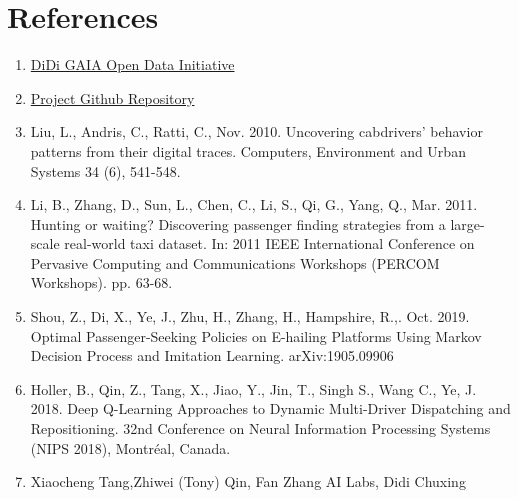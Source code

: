 \documentclass[11pt]{article}
\begin{document}
\section{References} 
\begin{enumerate}
    \item \href{https://outreach.didichuxing.com/research/opendata/en/}{DiDi GAIA Open Data Initiative}
    
    \item \href{https://github.com/rmahajan14/capstone_didi}{Project Github Repository}
    
    \item Liu, L., Andris, C., Ratti, C., Nov. 2010. Uncovering cabdrivers' behavior patterns from their digital traces. Computers, Environment and Urban Systems 34 (6), 541-548.
    
    \item Li, B., Zhang, D., Sun, L., Chen, C., Li, S., Qi, G., Yang, Q., Mar. 2011. Hunting or waiting? Discovering passenger finding strategies from a large-scale real-world taxi dataset. In: 2011 IEEE International Conference on Pervasive Computing and Communications Workshops (PERCOM Workshops). pp. 63-68.
    
    \item Shou, Z., Di, X., Ye, J., Zhu, H., Zhang, H., Hampshire, R.,. Oct. 2019. Optimal Passenger-Seeking Policies on E-hailing Platforms Using Markov Decision Process and Imitation Learning. arXiv:1905.09906
    
    \item Holler, B., Qin, Z., Tang, X., Jiao, Y., Jin, T., Singh S., Wang C., Ye, J. 2018. Deep Q-Learning Approaches to Dynamic Multi-Driver Dispatching and Repositioning. 32nd Conference on Neural Information Processing Systems (NIPS 2018), Montréal, Canada.
    
     \item Xiaocheng Tang,Zhiwei (Tony) Qin, Fan Zhang
AI Labs, Didi Chuxing
    
\end{enumerate}
\end{document}
